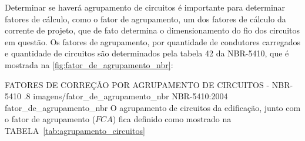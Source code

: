 Determinar se haverá agrupamento de circuitos é importante para determinar fatores de cálculo, como o fator de agrupamento, um dos fatores de cálculo da corrente de projeto, que de fato determina o dimensionamento do fio dos circuitos em questão. Os fatores de agrupamento, por quantidade de condutores carregados e quantidade de circuitos são determinados pela tabela 42 da NBR-5410, que é mostrada na \autoref{fig:fator_de_agrupamento_nbr}:

\figura
{FATORES DE CORREÇÃO POR AGRUPAMENTO DE CIRCUITOS - NBR-5410} %
{.8} %
{imagens/fator_de_agrupamento_nbr} %
{NBR-5410:2004} %
{fator_de_agrupamento_nbr} %
{}
{}
\pagebreak
O agrupamento de circuitos da edificação, junto com o fator de agrupamento ($FCA$) fica definido como mostrado na TABELA~\ref{tab:agrupamento_circuitos}

